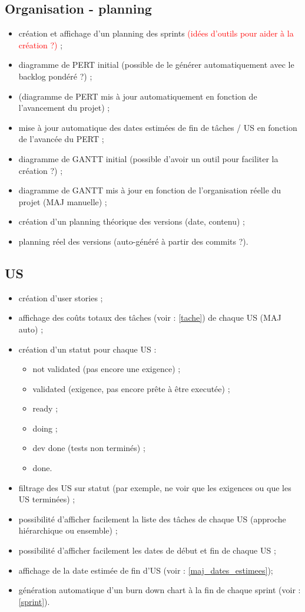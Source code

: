 \subsection{Organisation - planning}
\begin{itemize}
\item cr\'eation et affichage d'un planning des sprints\label{sprint} \textcolor{red}{(id\'ees d'outils pour aider \`a la cr\'eation ?)} ;
\item diagramme de PERT initial (possible de le g\'en\'erer automatiquement avec le backlog pond\'er\'e ?) ;
\item (diagramme de PERT mis \`a jour automatiquement en fonction de l'avancement du projet) ;
\item mise \`a jour automatique des dates estim\'ees de fin de t\^aches / US en fonction de l'avanc\'ee du PERT\label{maj_dates_estimees} ;
\item diagramme de GANTT initial (possible d'avoir un outil pour faciliter la cr\'eation ?) ;
\item diagramme de GANTT mis \`a jour en fonction de l'organisation r\'eelle du projet (MAJ manuelle) ;
\item cr\'eation d'un planning th\'eorique des versions (date, contenu) ;
\item planning r\'eel des versions (auto-g\'en\'er\'e \`a partir des commits ?).
\end{itemize}

\subsection{US}
\begin{itemize}
\item cr\'eation d'user stories ;
\item affichage des co\^uts totaux des t\^aches (voir : \ref{tache}) de chaque US (MAJ auto) ;
\item cr\'eation d'un statut pour chaque US :
\begin{itemize}
\item not validated (pas encore une exigence) ;
\item validated (exigence, pas encore pr\^ete \`a \^etre execut\'ee) ;
\item ready ;
\item doing ;
\item dev done (tests non termin\'es) ;
\item done.
\end{itemize}
\item filtrage des US sur statut (par exemple, ne voir que les exigences ou que les US termin\'ees) ;
\item possibilit\'e d'afficher facilement la liste des t\^aches de chaque US (approche hi\'erarchique ou ensemble) ;
\item possibilit\'e d'afficher facilement les dates de d\'ebut et fin de chaque US ;
\item affichage de la date estim\'ee de fin d'US (voir : \ref{maj_dates_estimees});
\item g\'en\'eration automatique d'un burn down chart \`a la fin de chaque sprint (voir : \ref{sprint}).
\end{itemize}

